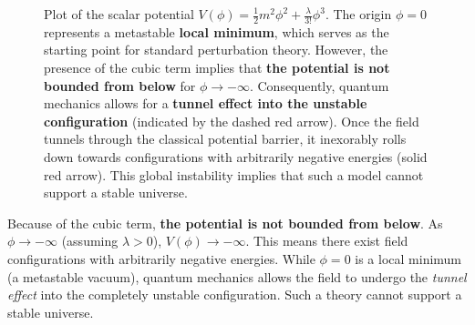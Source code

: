 \begin{figure}[H]
    \centering
    \begin{minipage}{0.48\textwidth}
        \centering
    \end{minipage}\hfill
    \begin{minipage}{0.48\textwidth}
        \caption{Plot of the scalar potential $V(\phi) = \frac{1}{2}m^2\phi^2 + \frac{\lambda}{3!}\phi^3$. The origin $\phi=0$ represents a metastable \textbf{local minimum}, which serves as the starting point for standard perturbation theory. However, the presence of the cubic term implies that \textbf{the potential is not bounded from below} for $\phi \to -\infty$. Consequently, quantum mechanics allows for a \textbf{tunnel effect into the unstable configuration} (indicated by the dashed red arrow). Once the field tunnels through the classical potential barrier, it inexorably rolls down towards configurations with arbitrarily negative energies (solid red arrow). This global instability implies that such a model cannot support a stable universe.}
        \label{fig:phi3_potential}
    \end{minipage}
\end{figure}

Because of the cubic term, \textbf{the potential is not bounded from below}. As \(\phi \to -\infty\) (assuming \(\lambda > 0\)), \(V(\phi) \to -\infty\). This means there exist field configurations with arbitrarily negative energies. While \(\phi = 0\) is a local minimum (a metastable vacuum), quantum mechanics allows the field to undergo the \textit{tunnel effect} into the completely unstable configuration. Such a theory cannot support a stable universe.

